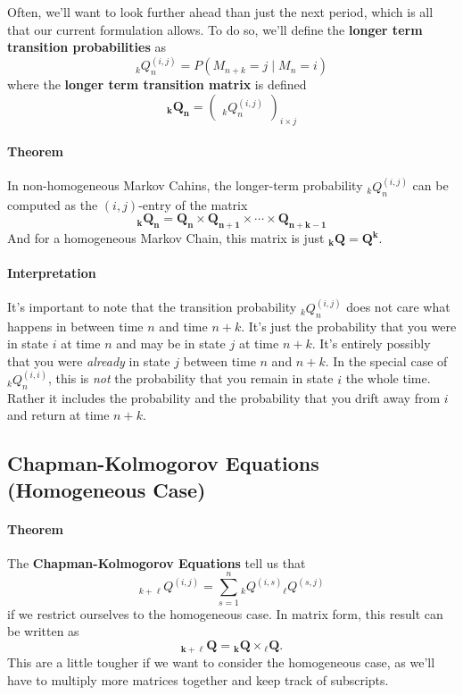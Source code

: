 \documentclass[a4paper,12pt]{scrartcl}
\begin{document}
Often, we'll want to look further ahead than just the next period, which
is all that our current formulation allows. To do so, we'll define
the \textbf{longer term transition probabilities} as 
\[ {}_kQ_n^{(i,j)} = P(M_{n+k} = j \;|\; M_n = i ) \]
where the \textbf{longer term transition matrix} is defined
   \[\mathbf{{}_kQ_n}=
      \begin{pmatrix} {}_kQ_n^{(i,j)}\end{pmatrix}_{i \times j}
      \]
      
\paragraph{Theorem} In non-homogeneous Markov Cahins, the longer-term
probability ${}_kQ_n^{(i,j)}$ can be computed as the $(i,j)$-entry of
the matrix 
   \[\mathbf{{}_kQ_n}= \mathbf{Q_n} \times \mathbf{Q_{n+1}} \times
      \cdots \times \mathbf{Q_{n+k-1}} 
            \]
And for a homogeneous Markov Chain, this matrix is just 
$\mathbf{{}_kQ} = \mathbf{Q^k}$.

\paragraph{Interpretation} It's important to note that the transition
probability ${}_kQ_n^{(i,j)}$ does not care what happens in between
time $n$ and time $n+k$.  It's just the probability that you were in
state $i$ at time $n$ and may be in state $j$ at time $n+k$.  It's
entirely possibly that you were \emph{already} in state $j$ between
time $n$ and $n+k$. In the special case of ${}_kQ_n^{(i,i)}$, this is
\emph{not} the probability that you remain in state $i$ the whole time.
Rather it includes the probability and the probability that you drift
away from $i$ and return at time $n+k$.

\subsection{Chapman-Kolmogorov Equations (Homogeneous Case)}

\paragraph{Theorem} The \textbf{Chapman-Kolmogorov Equations} tell us
that 
\[{}_{k+\ell}Q^{(i,j)} = \sum^n_{s=1} {}_{k}Q^{(i,s)} 
   {}_{\ell}Q^{(s,j)} \]
if we restrict ourselves to the homogeneous case.  In matrix form, 
this result can be written as
   \[ \mathbf{{}_{k+\ell}Q} = \mathbf{{}_{k}Q} \times 
      \mathbf{{}_{\ell}Q}.\]
This are a little tougher if we want to consider the homogeneous case,
as we'll have to multiply more matrices together and keep track of
subscripts.
\end{document}
